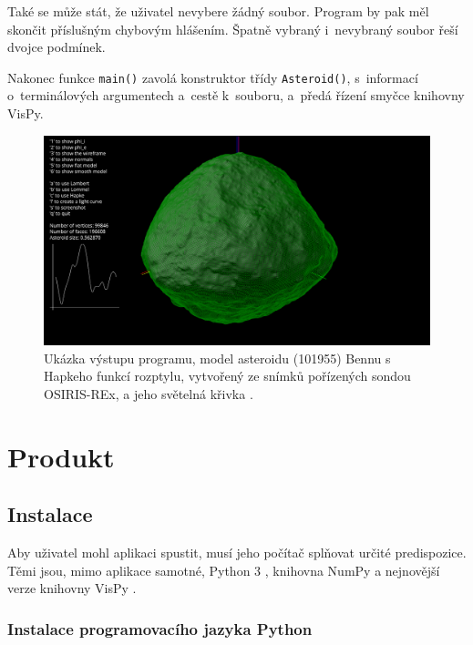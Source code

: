\documentclass[11pt]{article}
\begin{document}
Také se může stát, že uživatel nevybere žádný soubor. Program by pak měl skončit příslušným chybovým hlášením. Špatně vybraný i~nevybraný soubor řeší dvojce podmínek.



Nakonec funkce \verb|main()| zavolá konstruktor třídy \verb|Asteroid()|, s~informací o~terminálových argumentech a~cestě k~souboru, a~předá řízení smyčce knihovny VisPy.



\begin{figure}[h]
\includegraphics[width=12cm]{figs/Bennu.png}
\centering
\caption{Ukázka výstupu programu, model asteroidu (101955) Bennu s Hapkeho funkcí rozptylu,
vytvořený ze snímků pořízených sondou OSIRIS-REx, a jeho světelná křivka
\cite{Lauretta_2019Sci...366.3544L,Lauretta_2022Sci...377..285L}.
}
\label{bennu}
\end{figure}


\newpage
\section{Produkt}

\subsection{Instalace}

Aby uživatel mohl aplikaci spustit, musí jeho počítač splňovat určité predispozice. Těmi jsou, mimo aplikace samotné, Python 3 \cite{python}, knihovna NumPy \cite{numpy} a nejnovější verze knihovny VisPy \cite{vispy}. 

\subsubsection{Instalace programovacího jazyka Python}
\end{document}
